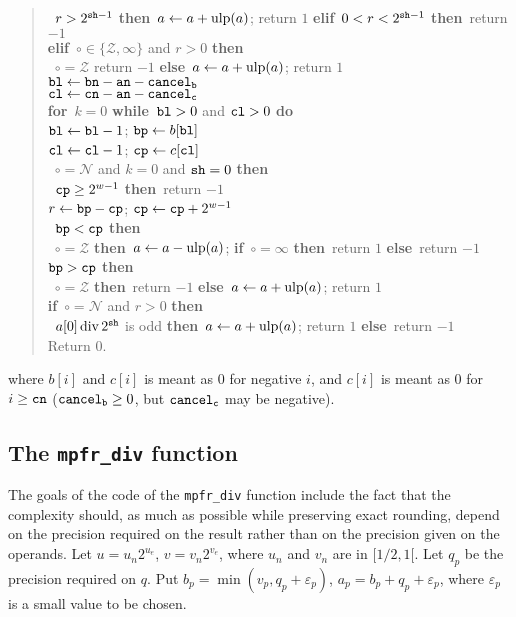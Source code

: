 \documentclass[12pt]{amsart}
\def\q{\hspace*{5mm}}
\def\ulp{{\rm ulp}}
\def\Z{{\mathcal Z}}
\def\N{{\mathcal N}}
\def\If{{\bf if}}
\def\then{{\bf then}}
\def\Else{{\bf else}}
\def\elif{{\bf elif}}
\def\for{{\bf for}}
\def\while{{\bf while}}
\begin{document}
\begin{quote}
\q \If\ $r > 2^{{\tt sh}-1}$ \then\
	$a \leftarrow a + \ulp(a)$; return $1$
   \elif\ $0 < r < 2^{{\tt sh}-1}$ \then\ return $-1$ \\
\elif\ $\circ \in \{ \Z, \infty \}$ and $r > 0$ \then \\
\q \If\ $\circ = \Z$ return $-1$
   \Else\ $a \leftarrow a + \ulp(a)$; return $1$ \\
${\tt bl} \leftarrow {\tt bn} - {\tt an} - {\tt cancel_b}$ \\
${\tt cl} \leftarrow {\tt cn} - {\tt an} - {\tt cancel_c}$ \\
\for\ $k=0$ \while\ ${\tt bl} > 0$ and ${\tt cl} > 0$ {\bf do} \\
\q ${\tt bl} \leftarrow {\tt bl} - 1$; ${\tt bp} \leftarrow b[{\tt bl}]$ \\
\q ${\tt cl} \leftarrow {\tt cl} - 1$; ${\tt cp} \leftarrow c[{\tt cl}]$ \\
\q \If\ $\circ = \N$ and $k=0$ and ${\tt sh}=0$ \then \\
\q \q \If\ ${\tt cp} \ge 2^{w-1}$ \then\ return $-1$ \\
\q \q $r \leftarrow {\tt bp} - {\tt cp}$; \quad 
	${\tt cp} \leftarrow {\tt cp} + 2^{w-1}$ \\
\q \If\ ${\tt bp} < {\tt cp}$ \then \\
\q \q \If\ $\circ = \Z$ \then\ $a \leftarrow a - \ulp(a)$; \quad
      \If\ $\circ = \infty$ \then\ return $1$ \Else\ return $-1$
\q \If\ ${\tt bp} > {\tt cp}$ \then \\
\q \q \If\ $\circ = \Z$ \then\ return $-1$ \Else\
	$a \leftarrow a + \ulp(a)$; return $1$ \\
\If\ $\circ = \N$ and $r > 0$ \then \\
\q \If\ $a[0] \, {\rm div} \, 2^{\tt sh}$ is odd \then\
	$a \leftarrow a + \ulp(a)$; return $1$ \Else\ return $-1$ \\
Return $0$.
\end{quote}
where $b[i]$ and $c[i]$ is meant as $0$ for negative $i$,
and $c[i]$ is meant as $0$ for $i \ge {\tt cn}$
(${\tt cancel_b} \ge 0$, but ${\tt cancel_c}$ may be negative).

\subsection{The {\tt mpfr\_div} function}
The goals of the code of the {\tt mpfr\_div} function include the fact
that the complexity should, as much as possible while preserving exact
rounding, depend on the precision required on the result rather than
on the precision given on the operands. Let $u = u_n 2^{u_e}$, $v = v_n
2^{v_e}$, where $u_n$ and $v_n$ are in $[1/2, 1[$. Let $q_p$ be the 
precision required on $q$. Put 
$b_p = \min(v_p, q_p + \varepsilon_p)$, 
$a_p = b_p + q_p + \varepsilon_p$, where $\varepsilon_p$ is a small value
to be chosen.
\end{document}

